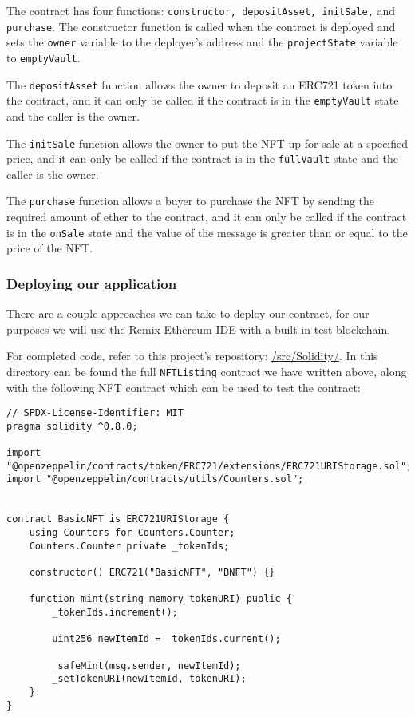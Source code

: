 \documentclass{article}
\theoremstyle{theorem}
\theoremstyle{definition}
\theoremstyle{remark}
\begin{document}
\medskip\noindent
The contract has four functions: \texttt{constructor, depositAsset, initSale,} and \texttt{purchase}. The constructor function is called when the contract is deployed and sets the \texttt{owner} variable to the deployer's address and the \texttt{projectState} variable to \texttt{emptyVault}. 

\medskip\noindent
The \texttt{depositAsset} function allows the owner to deposit an ERC721 token into the contract, and it can only be called if the contract is in the \texttt{emptyVault} state and the caller is the owner. 


\medskip\noindent
The \texttt{initSale} function allows the owner to put the NFT up for sale at a specified price, and it can only be called if the contract is in the \texttt{fullVault} state and the caller is the owner. 

\medskip\noindent
The \texttt{purchase} function allows a buyer to purchase the NFT by sending the required amount of ether to the contract, and it can only be called if the contract is in the \texttt{onSale} state and the value of the message is greater than or equal to the price of the NFT.

\subsubsection{Deploying our application}

There are a couple approaches we can take to deploy our contract, for our purposes we will use the \href{https://remix.ethereum.org}{Remix Ethereum IDE} with a built-in test blockchain.

\medskip\noindent
For completed code, refer to this project's repository: \colorbox{Gainsboro!60!Lavender}{\href{https://github.com/tylew/354-Programming-Languages/tree/main/src/Solidity}{/src/Solidity/}}. In this directory can be found the full \texttt{NFTListing} contract we have written above, along with the following NFT contract which can be used to test the contract:

\begin{itemize}
\begin{lstlisting}
// SPDX-License-Identifier: MIT
pragma solidity ^0.8.0;

import "@openzeppelin/contracts/token/ERC721/extensions/ERC721URIStorage.sol";
import "@openzeppelin/contracts/utils/Counters.sol";


contract BasicNFT is ERC721URIStorage {
    using Counters for Counters.Counter;
    Counters.Counter private _tokenIds;

    constructor() ERC721("BasicNFT", "BNFT") {}

    function mint(string memory tokenURI) public {
        _tokenIds.increment();

        uint256 newItemId = _tokenIds.current();

        _safeMint(msg.sender, newItemId);
        _setTokenURI(newItemId, tokenURI);
    }
}
\end{lstlisting}
\end{itemize}
\end{document}

